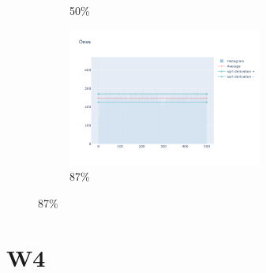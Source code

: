 \documentclass[12pt, fleqn]{report}                             %
\theoremstyle{break}                                            %
\begin{document}
\begin{figure}[h!]
\begin{subfigure}[b]{0.4\linewidth}
            \caption{50\%}
          \end{subfigure}
          \begin{subfigure}[b]{0.4\linewidth}
            \includegraphics[width=0.7\textwidth]{Images/126/dia-d.png}
            \caption{87\%}
          \end{subfigure}
        \end{figure}

      \section{W4}
\end{document}
